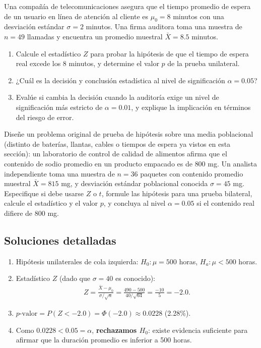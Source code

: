 \begin{problema}
	\label{prob:a9a27c5}
	Una compañía de telecomunicaciones asegura que el tiempo promedio de espera de un usuario en línea de atención al cliente es $\mu_0 = 8$ minutos con una desviación estándar $\sigma = 2$ minutos. Una firma auditora toma una muestra de $n = 49$ llamadas y encuentra un promedio muestral $\bar{X} = 8.5$ minutos.
	\begin{enumerate}
		\item Calcule el estadístico $Z$ para probar la hipótesis de que el tiempo de espera real excede los 8 minutos, y determine el valor $p$ de la prueba unilateral.
		\item ¿Cuál es la decisión y conclusión estadística al nivel de significación $\alpha = 0.05$?
		\item Evalúe si cambia la decisión cuando la auditoría exige un nivel de significación más estricto de $\alpha = 0.01$, y explique la implicación en términos del riesgo de error.
	\end{enumerate}
\end{problema}

\begin{problema}
	\label{prob:8843fed}
	Diseñe un problema original de prueba de hipótesis sobre una media poblacional (distinto de baterías, llantas, cables o tiempos de espera ya vistos en esta sección): un laboratorio de control de calidad de alimentos afirma que el contenido de sodio promedio en un producto empacado es de $800$ mg. Un analista independiente toma una muestra de $n=36$ paquetes con contenido promedio muestral $\bar{X}=815$ mg, y desviación estándar poblacional conocida $\sigma=45$ mg. Especifique si debe usarse $Z$ o $t$, formule las hipótesis para una prueba bilateral, calcule el estadístico y el valor $p$, y concluya al nivel $\alpha=0.05$ si el contenido real difiere de $800$ mg.
\end{problema}

\subsection*{Soluciones detalladas}

\begin{solproblema}[prob:c7ea911]
	\begin{enumerate}
		\item Hipótesis unilaterales de cola izquierda: $H_0: \mu = 500$ horas, $H_a: \mu < 500$ horas.
		\item Estadístico $Z$ (dado que $\sigma=40$ es conocido):
		\begin{align}
			Z = \frac{\bar{X} - \mu_0}{\sigma / \sqrt{n}} = \frac{490 - 500}{40 / \sqrt{64}} = \frac{-10}{5} = -2.0.
		\end{align}
		\item $p\text{-valor} = P(Z < -2.0) = \Phi(-2.0) \approx 0.0228$ (2.28\%).
		\item Como $0.0228 < 0.05 = \alpha$, \textbf{rechazamos $H_0$}: existe evidencia suficiente para afirmar que la duración promedio es inferior a 500 horas.
	\end{enumerate}
\end{solproblema}

